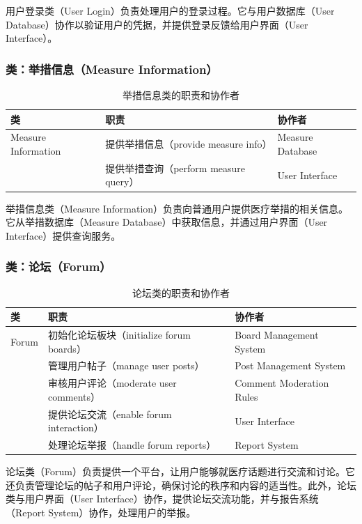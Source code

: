用户登录类（User Login）负责处理用户的登录过程。它与用户数据库（User Database）协作以验证用户的凭据，并提供登录反馈给用户界面（User Interface）。

\subsubsection{类：举措信息（Measure Information）}
\begin{table}[htbp]
	\centering
	\begin{tabular}{|l|l|l|}
		\hline
		\textbf{类} & \textbf{职责} & \textbf{协作者} \\
		\hline
		Measure Information & 提供举措信息（provide measure info） & Measure Database \\
		& 提供举措查询（perform measure query） & User Interface \\
		\hline
	\end{tabular}
	\caption{举措信息类的职责和协作者}
	\label{tab:measure_information}
\end{table}

举措信息类（Measure Information）负责向普通用户提供医疗举措的相关信息。它从举措数据库（Measure Database）中获取信息，并通过用户界面（User Interface）提供查询服务。

\subsubsection{类：论坛（Forum）}
\begin{table}[htbp]
	\centering
	\begin{tabular}{|l|l|l|}
		\hline
		\textbf{类} & \textbf{职责} & \textbf{协作者} \\
		\hline
		Forum & 初始化论坛板块（initialize forum boards） & Board Management System \\
		& 管理用户帖子（manage user posts） & Post Management System \\
		& 审核用户评论（moderate user comments） & Comment Moderation Rules \\
		& 提供论坛交流（enable forum interaction） & User Interface \\
		& 处理论坛举报（handle forum reports） & Report System \\
		\hline
	\end{tabular}
	\caption{论坛类的职责和协作者}
	\label{tab:forum}
\end{table}

论坛类（Forum）负责提供一个平台，让用户能够就医疗话题进行交流和讨论。它还负责管理论坛的帖子和用户评论，确保讨论的秩序和内容的适当性。此外，论坛类与用户界面（User Interface）协作，提供论坛交流功能，并与报告系统（Report System）协作，处理用户的举报。

